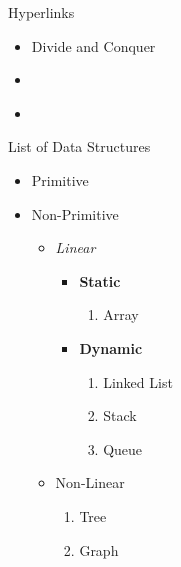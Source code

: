 \documentclass{beamer}[10pt]
\begin{document}
\begin{frame}{Hyperlinks}
\begin{itemize}
    \item Divide and Conquer
    \item \hyperlink{Algorithms}{}
    \item \hyperlink{Algorithms}{}
\end{itemize}
    
\end{frame}
\begin{frame}{List of Data Structures}
\begin{itemize}
    \item Primitive \pause
    \item Non-Primitive
    
    \begin{itemize}
        \item \textit{Linear} \pause
        \begin{itemize}
            \item<2-> \textbf{Static}
            \begin{enumerate}
                \item<4->{ Array}
            \end{enumerate}
            \item<2-> \textbf{Dynamic}
            \begin{enumerate}
                \item<4-> Linked List
                \item<4-> Stack
                \item<4-> Queue
            \end{enumerate}
        \end{itemize}
        \item<5-> Non-Linear
        \begin{enumerate}
            \item<5-> Tree
            \item<5-> Graph
        \end{enumerate}
    \end{itemize}
\end{itemize}
    
\end{frame}
\end{document}
